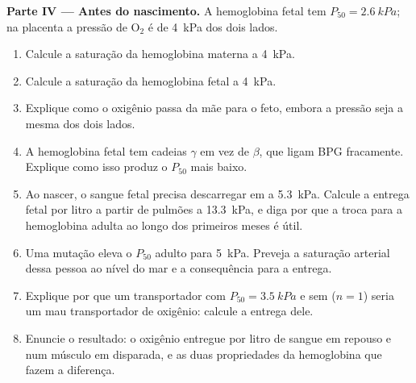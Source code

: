 \begin{problem}
\medskip
\noindent\textbf{Parte IV --- Antes do nascimento.}
A hemoglobina fetal tem $P_{50} = \qty{2.6}{kPa}$; na placenta a pressão
de $\mathrm{O_2}$ é de \qty{4}{kPa} dos dois lados.
\begin{enumerate}[resume]
  \item Calcule a saturação da hemoglobina materna a \qty{4}{kPa}.
  \item Calcule a saturação da hemoglobina fetal a \qty{4}{kPa}.
  \item Explique como o oxigênio passa da mãe para o feto, embora a
        pressão seja a mesma dos dois lados.
  \item A hemoglobina fetal tem cadeias $\gamma$ em vez de $\beta$, que
        ligam BPG fracamente. Explique como isso produz o $P_{50}$ mais
        baixo.
  \item Ao nascer, o sangue fetal precisa descarregar em  a
        \qty{5.3}{kPa}. Calcule a entrega fetal por litro a partir de
        pulmões a \qty{13.3}{kPa}, e diga por que a troca para a
        hemoglobina adulta ao longo dos primeiros meses é útil.
  \item Uma mutação eleva o $P_{50}$ adulto para \qty{5}{kPa}. Preveja a
        saturação arterial dessa pessoa ao nível do mar e a consequência
        para a entrega.
  \item Explique por que um transportador com $P_{50} = \qty{3.5}{kPa}$
        e sem  ($n = 1$) seria um mau transportador de
        oxigênio: calcule a entrega dele.
  \item Enuncie o resultado: o oxigênio entregue por litro de sangue em
        repouso e num músculo em disparada, e as duas propriedades da
        hemoglobina que fazem a diferença.
\end{enumerate}
\end{problem}
